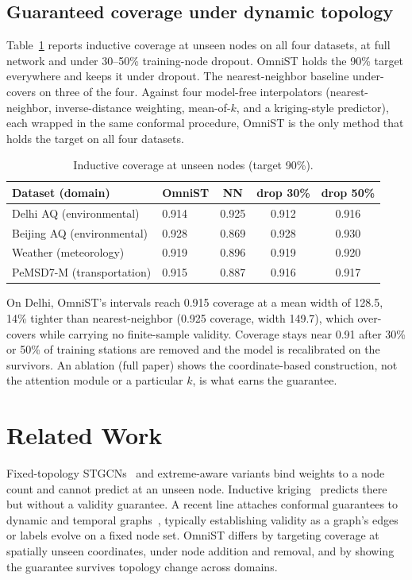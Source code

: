 \documentclass[conference]{IEEEtran}
\begin{document}
\subsection{Guaranteed coverage under dynamic topology}
Table~\ref{tab:cov} reports inductive coverage at unseen nodes on all four datasets, at full network and
under 30--50\% training-node dropout. OmniST holds the 90\% target everywhere and keeps it under dropout.
The nearest-neighbor baseline under-covers on three of the four. Against four model-free interpolators
(nearest-neighbor, inverse-distance weighting, mean-of-$k$, and a kriging-style predictor), each wrapped
in the same conformal procedure, OmniST is the only method that holds the target on all four datasets.

\begin{table}[htbp]
\caption{Inductive coverage at unseen nodes (target 90\%).}
\label{tab:cov}
\centering
\begin{tabular}{llccc}
\toprule
\textbf{Dataset (domain)} & \textbf{OmniST} & \textbf{NN} & \textbf{drop 30\%} & \textbf{drop 50\%} \\
\midrule
Delhi AQ (environmental)   & 0.914 & 0.925 & 0.912 & 0.916 \\
Beijing AQ (environmental) & 0.928 & 0.869 & 0.928 & 0.930 \\
Weather (meteorology)      & 0.919 & 0.896 & 0.919 & 0.920 \\
PeMSD7-M (transportation)  & 0.915 & 0.887 & 0.916 & 0.917 \\
\bottomrule
\end{tabular}
\end{table}

On Delhi, OmniST's intervals reach 0.915 coverage at a mean width of 128.5, 14\% tighter than
nearest-neighbor (0.925 coverage, width 149.7), which over-covers while carrying no finite-sample
validity. Coverage stays near 0.91 after 30\% or 50\% of training stations are removed and the model is
recalibrated on the survivors. An ablation (full paper) shows the coordinate-based construction, not the
attention module or a particular $k$, is what earns the guarantee.

\section{Related Work}
Fixed-topology STGCNs~\cite{yu2018stgcn} and extreme-aware variants bind weights to a node count and
cannot predict at an unseen node. Inductive kriging~\cite{ignnk2020} predicts there but without a
validity guarantee. A recent line attaches conformal guarantees to dynamic and temporal
graphs~\cite{conformalinductivegnn2024}, typically establishing validity as a graph's edges or labels
evolve on a fixed node set. OmniST differs by targeting coverage at spatially unseen coordinates, under
node addition and removal, and by showing the guarantee survives topology change across domains.
\end{document}
